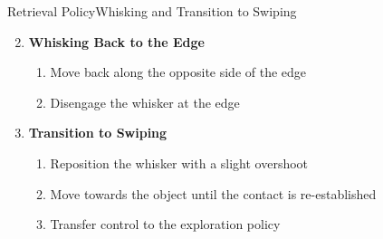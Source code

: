 \documentclass[AIRbeamer
,optEnglish
,optBiber
,optBibstyleAlphabetic
,optBeamerClassicFormat%
]{AIRlatex}
\begin{document}
    \begin{frame}[c]{Retrieval Policy}{Whisking and Transition to Swiping}
        \begin{enumerate}
            \setcounter{enumi}{1}
            \item \textbf{Whisking Back to the Edge}
            \begin{enumerate}
                \item Move back along the opposite side of the edge
                \item Disengage the whisker at the edge
            \end{enumerate}
            \item \textbf{Transition to Swiping}
            \begin{enumerate}
                \item Reposition the whisker with a slight overshoot
                \item Move towards the object until the contact is re-established
                \item Transfer control to the exploration policy
            \end{enumerate}
        \end{enumerate}
    \end{frame}
\end{document}
